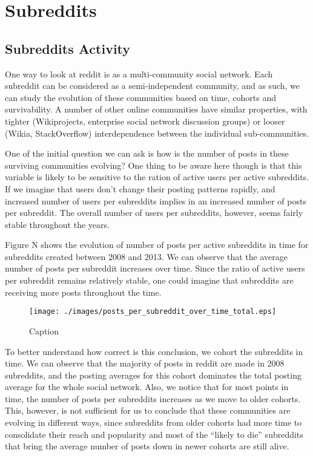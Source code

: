 \section{Subreddits}

\subsection{Subreddits Activity}

One way to look at reddit is as a multi-community social network. Each subreddit can be considered as a semi-independent community, and as such, we can study the evolution of these communities based on time, cohorts and survivability.  A number of other online communities have similar properties, with tighter (Wikiprojects, enterprise social network discussion groups) or looser (Wikia, StackOverflow) interdependence between the individual sub-communities.

One of the initial question we can ask is how is the number of posts in these surviving communities evolving? One thing to be aware here though is that this variable is likely to be sensitive to the ration of active users per active subreddits. If we imagine that users don't change their posting patterns rapidly, and increased number of users per subreddits implies in an increased number of posts per subreddit. The overall number of users per subreddits, however, seems fairly stable throughout the years.

Figure N shows the evolution of number of posts per active subreddits in time for subreddits created between 2008 and 2013. We can observe that the average number of posts per subreddit increases over time. Since the ratio of active users per subreddit remains relatively stable, one could imagine that subreddits are receiving more posts throughout the time.

\begin{figure}[!tb]
\centering
\texttt{[image: ./images/posts\_per\_subreddit\_over\_time\_total.eps]}
\caption{Caption}
\label{fig:posts_per_subreddit_over_time_total}
\end{figure}

To better understand how correct is this conclusion, we cohort the subreddits in time. We can observe that the majority of posts in reddit are made in 2008 subreddits, and the posting averages for this cohort dominates the total posting average for the whole social network. Also, we notice that for most points in time, the number of posts per subreddits increases as we move to older cohorts. This, however, is not sufficient for us to conclude that these communities are evolving in different ways, since subreddits from older cohorts had more time to consolidate their reach and popularity and most of the ``likely to die'' subreddits that bring the average number of posts down in newer cohorts are still alive.

